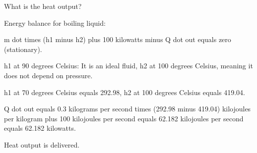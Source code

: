 What is the heat output?

Energy balance for boiling liquid:

m dot times (h1 minus h2) plus 100 kilowatts minus Q dot out equals zero (stationary).

h1 at 90 degrees Celsius: It is an ideal fluid, h2 at 100 degrees Celsius, meaning it does not depend on pressure.

h1 at 70 degrees Celsius equals 292.98, h2 at 100 degrees Celsius equals 419.04.

Q dot out equals 0.3 kilograms per second times (292.98 minus 419.04) kilojoules per kilogram plus 100 kilojoules per second equals 62.182 kilojoules per second equals 62.182 kilowatts.

Heat output is delivered.
